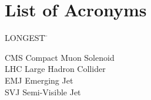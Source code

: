 

\chapter*{List of Acronyms}

 \noindent
\vspace{-1.75\baselineskip}
  \begin{tabbing}
LONGEST \=  \kill %

CMS \> Compact Muon Solenoid\\
LHC \> Large Hadron Collider\\ 
EMJ \> Emerging Jet\\
SVJ \> Semi-Visible Jet\\

\end{tabbing}